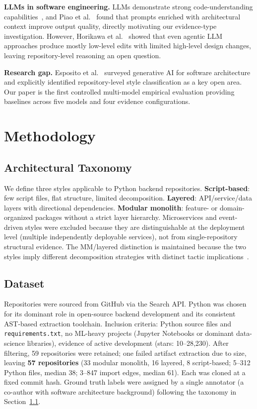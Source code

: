 \documentclass[runningheads]{llncs}
\begin{document}
\textbf{LLMs in software engineering.}
LLMs demonstrate strong code-understanding capabilities~\cite{liu2025exploring}, and Piao et al.~\cite{piao2025refactoring} found that prompts enriched with architectural context improve output quality, directly motivating our evidence-type investigation. However, Horikawa et al.~\cite{horikawa2025agentic} showed that even agentic LLM approaches produce mostly low-level edits with limited high-level design changes, leaving repository-level reasoning an open question.

\textbf{Research gap.}
Esposito et al.~\cite{esposito2025generative} surveyed generative AI for software architecture and explicitly identified repository-level style classification as a key open area. Our paper is the first controlled multi-model empirical evaluation providing baselines across five models and four evidence configurations.

\section{Methodology}
\label{sec:methodology}

\subsection{Architectural Taxonomy}
\label{sec:taxonomy}

We define three styles applicable to Python backend repositories. \textbf{Script-based}: few script files, flat structure, limited decomposition. \textbf{Layered}: API/service/data layers with directional dependencies. \textbf{Modular monolith}: feature- or domain-organized packages without a strict layer hierarchy. Microservices and event-driven styles were excluded because they are distinguishable at the deployment level (multiple independently deployable services), not from single-repository structural evidence. The MM/layered distinction is maintained because the two styles imply different decomposition strategies with distinct tactic implications~\cite{bass2021software}.

\subsection{Dataset}
\label{sec:dataset}

Repositories were sourced from GitHub via the Search API. Python was chosen for its dominant role in open-source backend development and its consistent AST-based extraction toolchain. Inclusion criteria: Python source files and \texttt{requirements.txt}, no ML-heavy projects (Jupyter Notebooks or dominant data-science libraries), evidence of active development (stars: 10--28{,}230). After filtering, 59 repositories were retained; one failed artifact extraction due to size, leaving \textbf{57 repositories} (33 modular monolith, 16 layered, 8 script-based; 5--312 Python files, median 38; 3--847 import edges, median 61). Each was cloned at a fixed commit hash. Ground truth labels were assigned by a single annotator (a co-author with software architecture background) following the taxonomy in Section~\ref{sec:taxonomy}.
\end{document}
